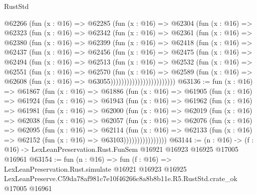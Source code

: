 \begin{lexlean}{RustStd}
\begin{coremodule}
            @62266
              (fun (x : @16) =>
              @62285
                (fun (x : @16) =>
                @62304
                  (fun (x : @16) =>
                  @62323
                    (fun (x : @16) =>
                    @62342
                      (fun (x : @16) =>
                      @62361
                        (fun (x : @16) =>
                        @62380
                          (fun (x : @16) =>
                          @62399
                            (fun (x : @16) =>
                            @62418
                              (fun (x : @16) =>
                              @62437
                                (fun (x : @16) =>
                                @62456
                                  (fun (x : @16) =>
                                  @62475
                                    (fun (x : @16) =>
                                    @62494
                                      (fun (x : @16) =>
                                      @62513
                                        (fun (x : @16) =>
                                        @62532
                                          (fun (x : @16) =>
                                          @62551
                                            (fun (x : @16) =>
                                            @62570
                                              (fun (x : @16) =>
                                              @62589
                                                (fun (x : @16) =>
                                                @62608
                                                  (fun (x : @16) => @63055))))))))))))))))))))))))
@63136 := fun (x : @16) =>
  @61867
    (fun (x : @16) =>
    @61886
      (fun (x : @16) =>
      @61905
        (fun (x : @16) =>
        @61924
          (fun (x : @16) =>
          @61943
            (fun (x : @16) =>
            @61962
              (fun (x : @16) =>
              @61981
                (fun (x : @16) =>
                @62000
                  (fun (x : @16) =>
                  @62019
                    (fun (x : @16) =>
                    @62038
                      (fun (x : @16) =>
                      @62057
                        (fun (x : @16) =>
                        @62076
                          (fun (x : @16) =>
                          @62095
                            (fun (x : @16) =>
                            @62114
                              (fun (x : @16) =>
                              @62133
                                (fun (x : @16) => @62152 (fun (x : @16) => @63103))))))))))))))))
@63144 := (n : @16) ->
  (f : @16) -> LexLeanPreservation.Rust.FunSem @16921 @16923 @16925 @17005 @16961
@63154 := fun (n : @16) =>
  fun (f : @16) =>
  LexLeanPreservation.Rust.simulate
    @16921
    @16923
    @16925
    LexLeanPreserve.C59da78af981c7e10f46266c8a8b8b11e.R5.RustStd.crate_ok
    @17005
    @16961
\end{coremodule}
\end{lexlean}
